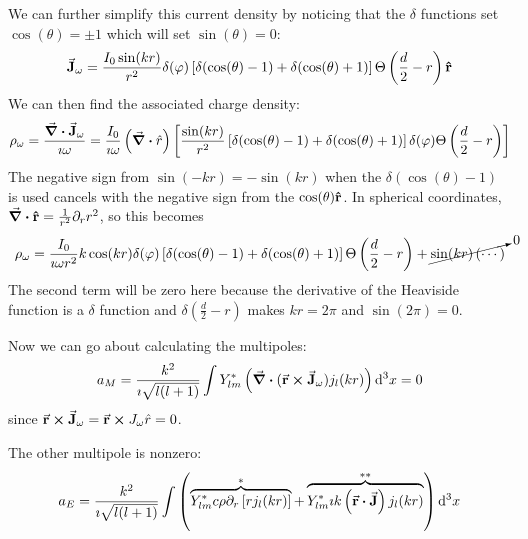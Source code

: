 \documentclass[a4paper,twoside]{article}
\begin{document}
\begin{itemize}
\begin{problem}
            We can further simplify this current density by noticing that the $\delta$ functions set $ \cos(\theta) = \pm 1 $ which will set $ \sin(\theta) = 0 $:
            \begin{equation}
                \va{J}_{\omega} = \frac{I_0 \sin(kr)}{r^2} \delta(\varphi) \left[ \delta(\cos(\theta) - 1) + \delta(\cos(\theta) + 1) \right] \Theta\left( \frac{d}{2} - r \right) \vu{r}
            \end{equation}
            We can then find the associated charge density:
            \begin{equation}
                \rho_{\omega} = \frac{\div{ \va{J}_{\omega}}}{\imath \omega} = \frac{I_0}{\imath \omega} \left( \div{ \hat{r}} \right) \left[ \frac{\sin(kr)}{r^2} \left[ \delta(\cos(\theta) - 1) + \delta(\cos(\theta) + 1) \right] \delta(\varphi) \Theta\left( \frac{d}{2} - r \right) \right]
            \end{equation}
            The negative sign from $ \sin(-kr) = - \sin(kr) $ when the $ \delta(\cos(\theta) - 1) $ is used cancels with the negative sign from the $ \cos(\theta) \vu{r} $. In spherical coordinates, $ \div{ \vu{r}} = \frac{1}{r^2} \partial_r r^2 $, so this becomes
            \begin{equation}
                \rho_{\omega} = \frac{I_0}{\imath \omega r^2} k \cos(kr) \delta(\varphi) \left[ \delta(\cos(\theta) - 1) + \delta(\cos(\theta) + 1 ) \right] \Theta\left( \frac{d}{2} - r \right) + \cancelto{0}{\sin(kr) \left( \cdots \right)}
            \end{equation}
            The second term will be zero here because the derivative of the Heaviside function is a $\delta$ function and $ \delta \left( \frac{d}{2} - r \right) $ makes $ kr = 2 \pi $ and $ \sin(2 \pi) = 0 $.

            Now we can go about calculating the multipoles:
            \begin{equation}
                a_M = \frac{k^2}{\imath \sqrt{l(l+1)}} \int Y_{lm}^* \left( \div{( \va{r} \cross \va{J}_{\omega})} j_l(kr) \right) \dd[3]{x} = 0
            \end{equation}
            since $ \va{r} \cross \va{J}_{\omega} = \va{r} \cross J_{\omega} \hat{r} = 0 $.

            The other multipole is nonzero:
            \begin{equation}
                a_E = \frac{k^2}{\imath \sqrt{l(l+1)}} \int \left( \overbrace{Y_{lm}^*c \rho \partial_r \left[ r j_l(kr) \right]}^{\ast} + \overbrace{Y_{lm}^*\imath k \left( \va{r} \vdot \va{J} \right) j_l(kr)}^{\ast\ast} \right) \dd[3]{x}
            \end{equation}


\end{problem}
\end{itemize}
\end{document}
